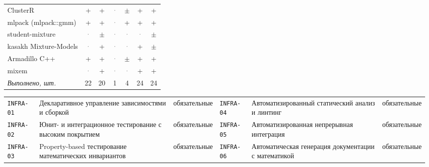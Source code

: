 \documentclass[10pt,a4paper]{article}
\begin{document}
\begin{landscape}
{\begin{longtable}{@{}l *{6}{c}@{}}
ClusterR & \cellcolor{yes!35}+ & \cellcolor{yes!35}+ & \textcolor{gray}{·} & \cellcolor{part!45}$\pm$ & \cellcolor{yes!35}+ & \cellcolor{yes!35}+ \\
mlpack (mlpack::gmm) & \cellcolor{yes!35}+ & \cellcolor{yes!35}+ & \textcolor{gray}{·} & \cellcolor{yes!35}+ & \cellcolor{yes!35}+ & \cellcolor{yes!35}+ \\
student-mixture & \textcolor{gray}{·} & \cellcolor{part!45}$\pm$ & \textcolor{gray}{·} & \textcolor{gray}{·} & \textcolor{gray}{·} & \cellcolor{part!45}$\pm$ \\
kasakh Mixture-Models & \textcolor{gray}{·} & \cellcolor{yes!35}+ & \textcolor{gray}{·} & \textcolor{gray}{·} & \cellcolor{yes!35}+ & \cellcolor{part!45}$\pm$ \\
Armadillo C++ & \cellcolor{yes!35}+ & \cellcolor{yes!35}+ & \textcolor{gray}{·} & \cellcolor{part!45}$\pm$ & \cellcolor{yes!35}+ & \cellcolor{yes!35}+ \\
mixem & \textcolor{gray}{·} & \cellcolor{yes!35}+ & \textcolor{gray}{·} & \textcolor{gray}{·} & \cellcolor{yes!35}+ & \cellcolor{yes!35}+ \\
\midrule \textit{Выполнено, шт.} & 22 & 20 & 1 & 4 & 24 & 24 \\
\bottomrule
\end{longtable}}
{\scriptsize\setlength{\tabcolsep}{3pt}
\begin{tabular}{@{}l >{\raggedright\arraybackslash}p{7.4cm} l l >{\raggedright\arraybackslash}p{7.4cm} l@{}}
\texttt{INFRA-01} & Декларативное управление зависимостями и сборкой & обязательные & \texttt{INFRA-04} & Автоматизированный статический анализ и линтинг & обязательные \\
\texttt{INFRA-02} & Юнит- и интеграционное тестирование с высоким покрытием & обязательные & \texttt{INFRA-05} & Автоматизированная непрерывная интеграция & обязательные \\
\texttt{INFRA-03} & Property-based тестирование математических инвариантов & обязательные & \texttt{INFRA-06} & Автоматическая генерация документации с математикой & обязательные \\
\end{tabular}}


\end{landscape}
\end{document}

